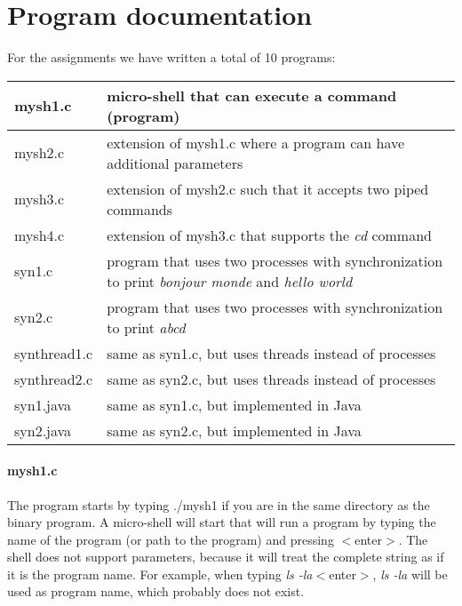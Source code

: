 \documentclass[a4paper,10pt]{article}
\begin{document}
\section{Program documentation}
For the assignments we have written a total of 10 programs:
\begin{center}
\begin{tabular}{ l | p{9cm} }
mysh1.c & micro-shell that can execute a command (program) \\ \hline
mysh2.c & extension of mysh1.c where a program can have additional parameters \\ \hline
mysh3.c & extension of mysh2.c such that it accepts two piped commands \\ \hline
mysh4.c & extension of mysh3.c that supports the \emph{cd} command \\ \hline
syn1.c & program that uses two processes with synchronization to print \emph{bonjour monde} and \emph{hello world} \\ \hline
syn2.c & program that uses two processes with synchronization to print \emph{abcd} \\ \hline
synthread1.c & same as syn1.c, but uses threads instead of processes \\ \hline
synthread2.c & same as syn2.c, but uses threads instead of processes \\ \hline
syn1.java & same as syn1.c, but implemented in Java \\ \hline
syn2.java & same as syn2.c, but implemented in Java
\end{tabular}
\end{center}
\paragraph{mysh1.c} The program starts by typing ./mysh1 if you are in the same directory as the binary program. A micro-shell will start that will run a program by typing the name of the program (or path to the program) and pressing $<$enter$>$. The shell does not support parameters, because it will treat the complete string as if it is the program name. For example, when typing \emph{ls -la}$<$enter$>$, \emph{ls -la} will be used as program name, which probably does not exist.
\end{document}
